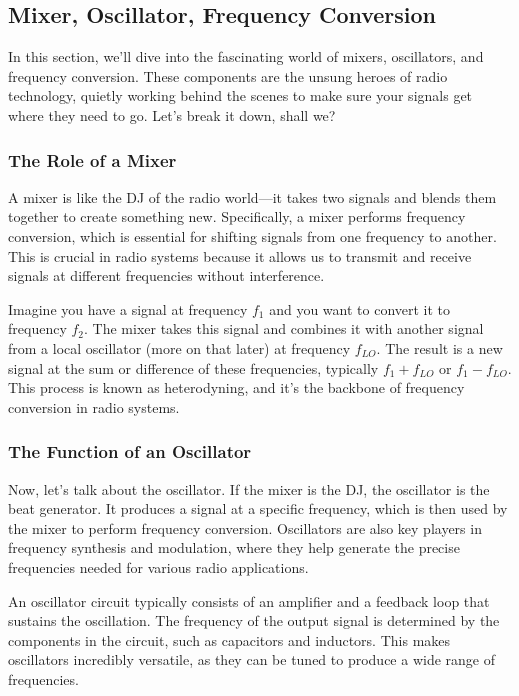 \subsection{Mixer, Oscillator, Frequency Conversion}
\label{subsec:mixer-osc}

In this section, we'll dive into the fascinating world of mixers, oscillators, and frequency conversion. These components are the unsung heroes of radio technology, quietly working behind the scenes to make sure your signals get where they need to go. Let's break it down, shall we?

\subsubsection*{The Role of a Mixer}

A mixer is like the DJ of the radio world—it takes two signals and blends them together to create something new. Specifically, a mixer performs frequency conversion, which is essential for shifting signals from one frequency to another. This is crucial in radio systems because it allows us to transmit and receive signals at different frequencies without interference.

Imagine you have a signal at frequency \( f_1 \) and you want to convert it to frequency \( f_2 \). The mixer takes this signal and combines it with another signal from a local oscillator (more on that later) at frequency \( f_{LO} \). The result is a new signal at the sum or difference of these frequencies, typically \( f_1 + f_{LO} \) or \( f_1 - f_{LO} \). This process is known as heterodyning, and it's the backbone of frequency conversion in radio systems.

\subsubsection*{The Function of an Oscillator}

Now, let's talk about the oscillator. If the mixer is the DJ, the oscillator is the beat generator. It produces a signal at a specific frequency, which is then used by the mixer to perform frequency conversion. Oscillators are also key players in frequency synthesis and modulation, where they help generate the precise frequencies needed for various radio applications.

An oscillator circuit typically consists of an amplifier and a feedback loop that sustains the oscillation. The frequency of the output signal is determined by the components in the circuit, such as capacitors and inductors. This makes oscillators incredibly versatile, as they can be tuned to produce a wide range of frequencies.

